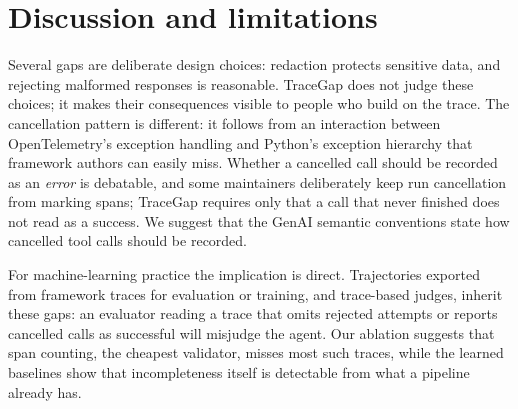 \documentclass[10pt]{article}
\begin{document}
\begin{table}[t]
\centering\small
{}
\caption{Leave-one-framework-out: train on eight frameworks, test on the ninth (all splits pooled; one training run per fold). CrewAI has six defective cases, all from past releases, so its F1 is near zero for most methods: with almost no positives, a few missed cases dominate the score. Per-framework F1 is therefore not a ranking of frameworks or of how hard they are.}
\label{tab:lofo}
\end{table}

\section{Discussion and limitations}
\label{sec:discussion}

Several gaps are deliberate design choices: redaction protects sensitive data, and rejecting malformed responses is reasonable. TraceGap does not judge these choices; it makes their consequences visible to people who build on the trace. The cancellation pattern is different: it follows from an interaction between OpenTelemetry's exception handling and Python's exception hierarchy that framework authors can easily miss. Whether a cancelled call should be recorded as an \emph{error} is debatable, and some maintainers deliberately keep run cancellation from marking spans; TraceGap requires only that a call that never finished does not read as a success. We suggest that the GenAI semantic conventions state how cancelled tool calls should be recorded.

For machine-learning practice the implication is direct. Trajectories exported from framework traces for evaluation or training, and trace-based judges, inherit these gaps: an evaluator reading a trace that omits rejected attempts or reports cancelled calls as successful will misjudge the agent. Our ablation suggests that span counting, the cheapest validator, misses most such traces, while the learned baselines show that incompleteness itself is detectable from what a pipeline already has.
\end{document}
